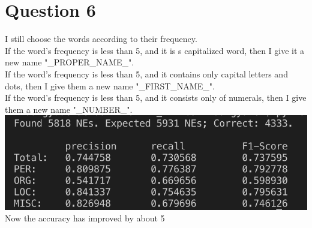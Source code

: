 \documentclass[12pt]{article}
\begin{document}
\section*{Question 6}
I still choose the words according to their frequency.\\
If the word's frequency is less than 5, and it is s capitalized word, then I give it a new name "\_PROPER\_NAME\_".\\
If the word's frequency is less than 5, and it contains only capital letters and dots, then I give them a new name "\_FIRST\_NAME\_".\\
If the word's frequency is less than 5, and it consists only of numerals, then I give them a new name "\_NUMBER\_".\\
\includegraphics[scale=0.6]{6.png}\\
Now the accuracy has improved by about 5%


\end{document}

